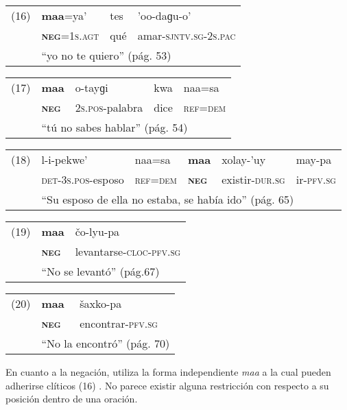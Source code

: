 {\setmainfont{Charis SIL}

\begin{tabular}{llll}
(16) & \textbf{maa}=ya'& tes & 'oo-daɡu-o' \\
& \textsc{\textbf{neg}}=\textsc{1s.agt} & qué & amar-\textsc{sjntv.sg-2s.pac} \\
& \multicolumn{3}{l}{``yo no te quiero'' (pág. 53)}
\end{tabular} \vspace{0.5cm}

\begin{tabular}{lllll}
(17) & \textbf{maa} & o-tayɡi & kwa & naa=sa \\
& \textsc{\textbf{neg}} & \textsc{2s.pos}-palabra & dice & \textsc{ref=dem} \\
& \multicolumn{4}{l}{``tú no sabes hablar'' (pág. 54)}
\end{tabular} \vspace{0.5cm}

\begin{tabular}{llllll}
(18) & l-i-pekwe’ & naa=sa & \textbf{maa} & xolay-’uy & may-pa \\
& \textsc{det-3s.pos}-esposo & \textsc{ref=dem} & \textsc{\textbf{neg}} & existir-\textsc{dur.sg} & ir-\textsc{pfv.sg} \\
& \multicolumn{5}{l}{``Su esposo de ella no estaba, se había ido'' (pág. 65)}
\end{tabular} \vspace{0.5cm}

\begin{tabular}{lll}
(19) & \textbf{maa} & čo-lyu-pa \\
& \textsc{\textbf{neg}} & levantarse-\textsc{cloc-pfv.sg} \\
& \multicolumn{2}{l}{``No se levantó'' (pág.67)}
\end{tabular} \vspace{0.5cm}

\begin{tabular}{lll}
(20) & \textbf{maa} & šaxko-pa \\
& \textsc{\textbf{neg}} & encontrar-\textsc{pfv.sg} \\
& \multicolumn{2}{l}{``No la encontró'' (pág. 70)}
\end{tabular} \vspace{0.5cm}

}

En cuanto a la negación, utiliza la forma independiente \textit{maa} a la cual pueden adherirse clíticos (16) \textcolor{MidnightBlue}{\citep{ChontalOaxaca}}. No parece existir alguna restricción con respecto a su posición dentro de una oración.